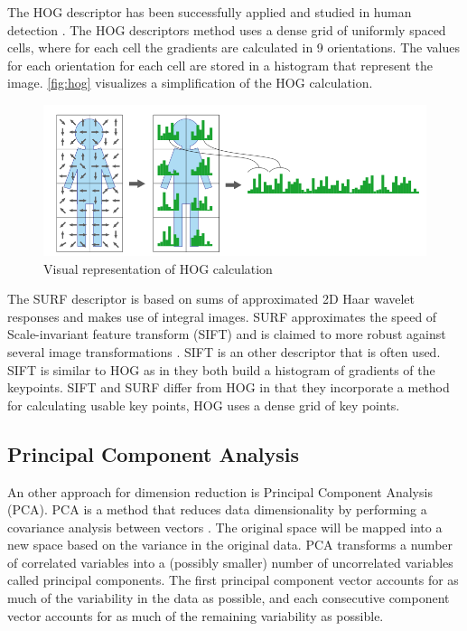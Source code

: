 The HOG descriptor has been successfully applied and studied in human detection \citep{NavneetDalal2006, watanabe2009}. The HOG descriptors method uses a dense grid of uniformly spaced cells, where for each cell the gradients are calculated in 9 orientations. The values for each orientation for each cell are stored in a histogram that represent the image. \autoref{fig:hog} visualizes a simplification of the HOG calculation. 

\begin{figure}[tb]
\center{}
\includegraphics[width=0.8\linewidth]{figures/hog.png}
\caption{Visual representation of HOG calculation}
\label{fig:hog}
\end{figure}


The SURF descriptor is based on sums of approximated 2D Haar wavelet responses and makes use of integral images. SURF approximates the speed of Scale-invariant feature transform (SIFT) and is claimed to more robust against several image transformations \citep{Murillo2007, Valgren2010}. SIFT is an other descriptor that is often used. SIFT is similar to HOG as in they both build a histogram of gradients of the keypoints. SIFT and SURF differ from HOG in that they incorporate a method for calculating usable key points, HOG uses a dense grid of key points.

\subsection{Principal Component Analysis}
An other approach for dimension reduction is Principal Component Analysis (PCA). PCA is a method that reduces data dimensionality by performing a covariance analysis between vectors \cite{jolliffe2002}. The original space will be mapped into a new space based on the variance in the original data. PCA transforms a number of correlated variables into a (possibly smaller) number of uncorrelated variables called principal components. The first principal component vector accounts for as much of the variability in the data as possible, and each consecutive component vector accounts for as much of the remaining variability as possible. 

